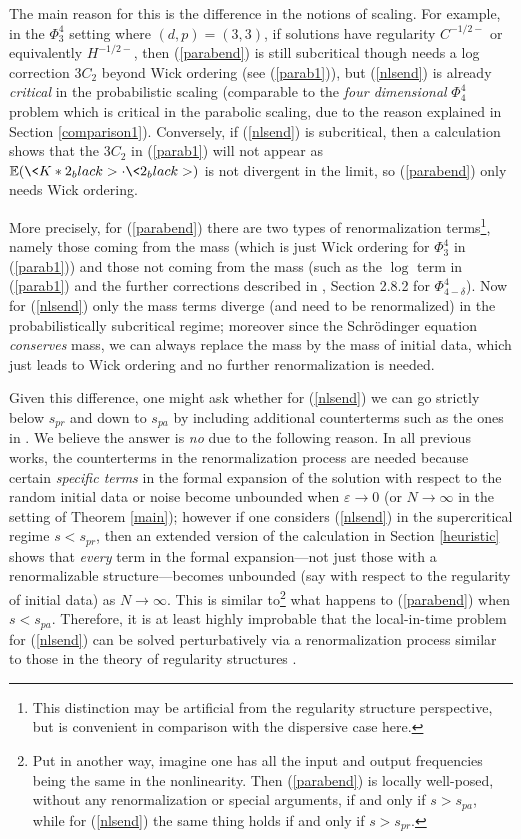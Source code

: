 \documentclass[11 pt,reqno]{amsart}
\theoremstyle{definition}
\theoremstyle{remark}
\numberwithin{equation}{section}
\begin{document}
{The main reason for this is the difference in the notions of scaling. For example, in the $\Phi_3^4$ setting where $(d,p)=(3,3)$, if solutions have regularity $C^{-1/2-}$ or equivalently $H^{-1/2-}$, then (\ref{parabend}) is still subcritical though needs a log correction $3C_2$ beyond Wick ordering (see (\ref{parab1})), but (\ref{nlsend}) is already \emph{critical} in the probabilistic scaling (comparable to the \emph{four dimensional} $\Phi_4^4$ problem which is critical in the parabolic scaling, due to the reason explained in Section \ref{comparison1}). Conversely, if (\ref{nlsend}) is subcritical, then a calculation shows that the $3C_2$ in (\ref{parab1}) will not appear as $\mathbb{E}(\<K*2_black>\cdot\<2_black>)$ is not divergent in the limit, so (\ref{parabend}) only needs Wick ordering.

More precisely, for (\ref{parabend}) there are two types of renormalization terms\footnote{This distinction may be artificial from the regularity structure perspective, but is convenient in comparison with the dispersive case here.}, namely those coming from the mass (which is just Wick ordering for $\Phi_3^4$ in (\ref{parab1})) and those not coming from the mass (such as the $\log$ term in (\ref{parab1}) and the further corrections described in \cite{BCCH}, Section 2.8.2 for $\Phi_{4-\delta}^4$). Now for (\ref{nlsend}) only the mass terms diverge (and need to be renormalized) in the probabilistically subcritical regime; moreover since the Schr\"{o}dinger equation \emph{conserves} mass, we can always replace the mass by the mass of initial data, which just leads to Wick ordering and no further renormalization is needed.

Given this difference, one might ask whether for (\ref{nlsend}) we can go strictly below $s_{pr}$ and down to $s_{pa}$ by including additional counterterms such as the ones in \cite{BCCH}. We believe the answer is \emph{no} due to the following reason. In all previous works, the counterterms in the renormalization process are needed because certain \emph{specific terms} in the formal expansion of the solution with respect to the random initial data or noise become unbounded when $\varepsilon\to 0$ (or $N\to\infty$ in the setting of Theorem \ref{main}); however if one considers (\ref{nlsend}) in the supercritical regime $s<s_{pr}$, then an extended version of the calculation in Section \ref{heuristic} shows that \emph{every} term in the formal expansion---not just those with a renormalizable structure---becomes unbounded (say with respect to the regularity of initial data) as $N\to\infty$. This is similar to\footnote{Put in another way, imagine one has all the input and output frequencies being the same in the nonlinearity. Then (\ref{parabend}) is locally well-posed, without any renormalization or special arguments, if and only if $s>s_{pa}$, while for (\ref{nlsend}) the same thing holds if and only if $s>s_{pr}$.} what happens to (\ref{parabend}) when $s<s_{pa}$. Therefore, it is at least highly improbable that the local-in-time problem for (\ref{nlsend}) can be solved perturbatively via a renormalization process similar to those in the theory of regularity structures \cite{Hairer,Hairer3,Hairer4, BCCH}.
}
\end{document}
